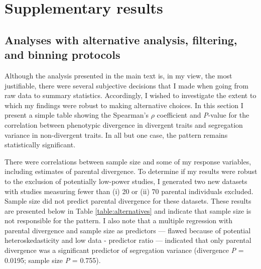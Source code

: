 \documentclass[times, twoside, watermark]{zHenriquesLab-StyleBioRxiv}
\begin{document}
\newpage

\captionsetup*{format=largeformat}
\section{Supplementary results} \label{section:Supplementary results}
\subsection{Analyses with alternative analysis, filtering, and binning protocols}

Although the analysis presented in the main text is, in my view, the most justifiable, there were several subjective decisions that I made when going from raw data to summary statistics. Accordingly, I wished to investigate the extent to which my findings were robust to making alternative choices. In this section I present a simple table showing the Spearman's $\rho$ coefficient and \textit{P}-value for the correlation between phenotypic divergence in divergent traits and segregation variance in non-divergent traits. In all but one case, the pattern remains statistically significant.

There were correlations between sample size and some of my response variables, including estimates of parental divergence. To determine if my results were robust to the exclusion of potentially low-power studies, I generated two new datasets with studies measuring fewer than (i) 20 or (ii) 70 parental individuals excluded. Sample size did not predict parental divergence for these datasets. These results are presented below in Table \ref{table:alternatives} and indicate that sample size is not responsible for the pattern. I also note that a multiple regression with parental divergence and sample size as predictors --- flawed because of potential heteroskedasticity and low data - predictor ratio --- indicated that only parental divergence was a significant predictor of segregation variance (divergence \textit{P} = 0.0195; sample size \textit{P} = 0.755).

\end{document}
